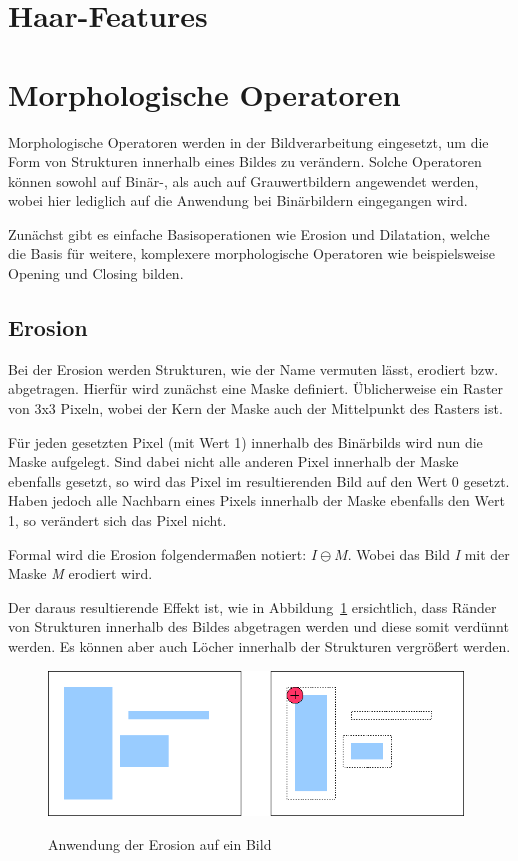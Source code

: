 \section{Haar-Features} %

\section{Morphologische Operatoren} %
Morphologische Operatoren werden in der Bildverarbeitung eingesetzt, um die Form von Strukturen innerhalb eines Bildes zu verändern.
Solche Operatoren können sowohl auf Binär-, als auch auf Grauwertbildern angewendet werden, wobei hier lediglich auf die Anwendung bei Binärbildern
eingegangen wird.

Zunächst gibt es einfache Basisoperationen wie Erosion und Dilatation, welche die Basis für weitere, komplexere morphologische Operatoren wie beispielsweise Opening und Closing bilden.

\subsection{Erosion}
Bei der Erosion werden Strukturen, wie der Name vermuten lässt, erodiert bzw. abgetragen.
Hierfür wird zunächst eine Maske definiert. Üblicherweise ein Raster von 3x3 Pixeln, wobei der Kern der Maske auch der Mittelpunkt des Rasters ist.

Für jeden gesetzten Pixel (mit Wert 1) innerhalb des Binärbilds wird nun die Maske aufgelegt. Sind dabei nicht alle anderen Pixel innerhalb der Maske ebenfalls gesetzt, so wird das Pixel im resultierenden Bild auf den Wert 0 gesetzt.
Haben jedoch alle Nachbarn eines Pixels innerhalb der Maske ebenfalls den Wert 1, so verändert sich das Pixel nicht.

Formal wird die Erosion folgendermaßen notiert: $ I \ominus M $. Wobei das Bild {\em I} mit der Maske {\em M} erodiert wird.

Der daraus resultierende Effekt ist, wie in Abbildung~\ref{fig:Erosion} ersichtlich, dass Ränder von Strukturen innerhalb des Bildes abgetragen werden und diese somit verdünnt werden. Es können aber auch Löcher innerhalb der Strukturen vergrößert werden.

\begin{figure}[ht]
   \centering
     \includegraphics[width=11cm]{Bilder/MorphologicalErosion} \\
 \caption{Anwendung der Erosion auf ein Bild}
 \label{fig:Erosion}
\end{figure}

